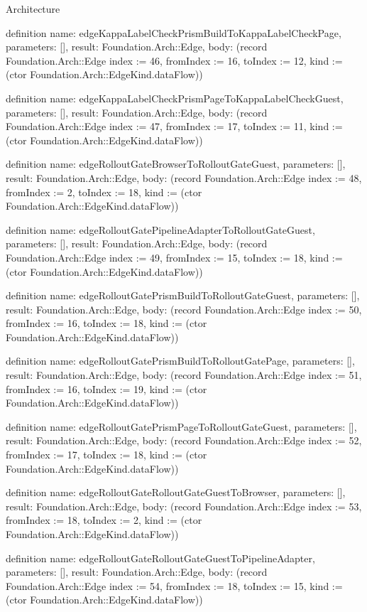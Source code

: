 \begin{lexlean}{Architecture}
\begin{semanticmodule}
definition{
  name: edgeKappaLabelCheckPrismBuildToKappaLabelCheckPage,
  parameters: [],
  result: Foundation.Arch::Edge,
  body: (record Foundation.Arch::Edge {index := 46, fromIndex := 16, toIndex := 12, kind := (ctor Foundation.Arch::EdgeKind.dataFlow)})
}

definition{
  name: edgeKappaLabelCheckPrismPageToKappaLabelCheckGuest,
  parameters: [],
  result: Foundation.Arch::Edge,
  body: (record Foundation.Arch::Edge {index := 47, fromIndex := 17, toIndex := 11, kind := (ctor Foundation.Arch::EdgeKind.dataFlow)})
}

definition{
  name: edgeRolloutGateBrowserToRolloutGateGuest,
  parameters: [],
  result: Foundation.Arch::Edge,
  body: (record Foundation.Arch::Edge {index := 48, fromIndex := 2, toIndex := 18, kind := (ctor Foundation.Arch::EdgeKind.dataFlow)})
}

definition{
  name: edgeRolloutGatePipelineAdapterToRolloutGateGuest,
  parameters: [],
  result: Foundation.Arch::Edge,
  body: (record Foundation.Arch::Edge {index := 49, fromIndex := 15, toIndex := 18, kind := (ctor Foundation.Arch::EdgeKind.dataFlow)})
}

definition{
  name: edgeRolloutGatePrismBuildToRolloutGateGuest,
  parameters: [],
  result: Foundation.Arch::Edge,
  body: (record Foundation.Arch::Edge {index := 50, fromIndex := 16, toIndex := 18, kind := (ctor Foundation.Arch::EdgeKind.dataFlow)})
}

definition{
  name: edgeRolloutGatePrismBuildToRolloutGatePage,
  parameters: [],
  result: Foundation.Arch::Edge,
  body: (record Foundation.Arch::Edge {index := 51, fromIndex := 16, toIndex := 19, kind := (ctor Foundation.Arch::EdgeKind.dataFlow)})
}

definition{
  name: edgeRolloutGatePrismPageToRolloutGateGuest,
  parameters: [],
  result: Foundation.Arch::Edge,
  body: (record Foundation.Arch::Edge {index := 52, fromIndex := 17, toIndex := 18, kind := (ctor Foundation.Arch::EdgeKind.dataFlow)})
}

definition{
  name: edgeRolloutGateRolloutGateGuestToBrowser,
  parameters: [],
  result: Foundation.Arch::Edge,
  body: (record Foundation.Arch::Edge {index := 53, fromIndex := 18, toIndex := 2, kind := (ctor Foundation.Arch::EdgeKind.dataFlow)})
}

definition{
  name: edgeRolloutGateRolloutGateGuestToPipelineAdapter,
  parameters: [],
  result: Foundation.Arch::Edge,
  body: (record Foundation.Arch::Edge {index := 54, fromIndex := 18, toIndex := 15, kind := (ctor Foundation.Arch::EdgeKind.dataFlow)})
}


\end{semanticmodule}
\end{lexlean}
